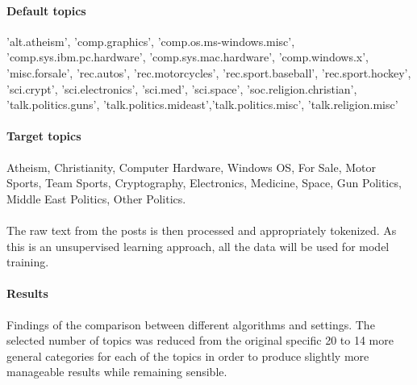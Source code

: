 \documentclass[12pt,a4paper]{report}
\begin{document}
\paragraph{Default topics}
\begin{minipage}{40em}
\begin{flushleft}
'alt.atheism', 'comp.graphics', 'comp.os.ms-windows.misc', 'comp.sys.ibm.pc.hardware', 'comp.sys.mac.hardware', 'comp.windows.x', 'misc.forsale', 'rec.autos', 'rec.motorcycles', 'rec.sport.baseball', 'rec.sport.hockey', 'sci.crypt', 'sci.electronics', 'sci.med', 'sci.space', 'soc.religion.christian', 'talk.politics.guns', 'talk.politics.mideast','talk.politics.misc', 'talk.religion.misc'
\end{flushleft}
\end{minipage}


\paragraph{Target topics} 
\begin{minipage}{40em}
\begin{flushleft}Atheism, Christianity, Computer Hardware, Windows OS,  For Sale, Motor Sports, Team Sports, Cryptography, Electronics, Medicine, Space, Gun Politics, Middle East Politics, Other Politics.
\end{flushleft}
\end{minipage}

\paragraph{} The raw text from the posts is then processed and appropriately tokenized. As this is an unsupervised learning approach, all the data will be used for model training.

\pagebreak 

\paragraph{Results} Findings of the comparison between different algorithms and settings. The selected number of topics was reduced from the original specific 20 to 14 more general categories for each of the topics in order to produce slightly more manageable results while remaining sensible. 
\end{document}
